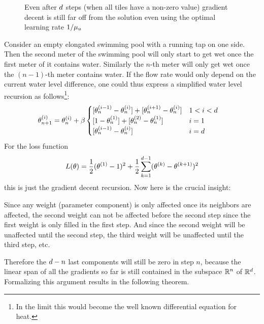 \begin{figure}[h]
	\centering
	\def\svgwidth{1\textwidth}
	
	\caption{Even after \(d\) steps (when all tiles have a non-zero value)
	gradient decent is still far off from the solution even using the optimal
	learning rate \(1/\mu_u\)}
	\label{fig: visualize coloring problem}
\end{figure}
%
Consider an empty elongated swimming pool with a running tap on one side. Then
the second meter of the swimming pool will only start to get wet once the first
meter of it contains water. Similarly the \(n\)-th meter will only get wet
once the \((n-1)\)-th meter contains water. If the flow rate would only depend
on the current water level difference, one could thus express a simplified
water level recursion as follows\footnote{In the limit this would become the
well known differential equation for heat.}: 
%
\begin{align*}
	\weights_{n+1}^{(i)}
	&= \weights_{n}^{(i)}
	+ \lr 
	\begin{cases}
		[\weights_{n}^{(i-1)} - \weights_{n}^{(i)}] + [\weights_{n}^{(i+1)} - \weights_{n}^{(i)}]
		&  1 < i < \dimension \\
		[1 - \weights_{n}^{(1)}] + [\weights_{n}^{(2)} - \weights_{n}^{(1)}]
		& i = 1 \\
		[\weights_{n}^{(i-1)} - \weights_{n}^{(i)}]
		& i = \dimension
	\end{cases}
\end{align*}
%
For the  loss function
%
\begin{align*}
	L(\theta) = \frac12 (\theta^{(1)}-1)^2  + \frac12 \sum_{k=1}^{d-1} (\theta^{(k)}-\theta^{(k+1)})^2
\end{align*}
%
this is just the gradient decent recursion. Now here is the crucial insight:

Since any weight (parameter component) is only affected once its neighbors are
affected, the second weight can not be affected before the second step since
the first weight is only filled in the first step. And since the second weight
will be unaffected until the second step, the third weight will be unaffected
until the third step, etc.

Therefore the \(d - n\) last components will still be zero in
step \(n\), because the linear span of all the gradients so far is still
contained in the subspace \(\mathbb{R}^n\) of \(\mathbb{R}^d\). Formalizing
this argument results in the following theorem.

